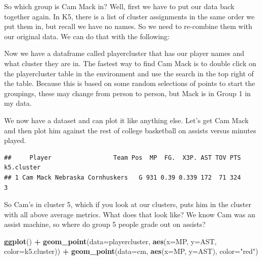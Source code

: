\documentclass[
]{book}
\newenvironment{Shaded}{\begin{snugshade}}{\end{snugshade}}
\newcommand{\DataTypeTok}[1]{\textcolor[rgb]{0.13,0.29,0.53}{#1}}
\newcommand{\KeywordTok}[1]{\textcolor[rgb]{0.13,0.29,0.53}{\textbf{#1}}}
\newcommand{\NormalTok}[1]{#1}
\newcommand{\OperatorTok}[1]{\textcolor[rgb]{0.81,0.36,0.00}{\textbf{#1}}}
\newcommand{\StringTok}[1]{\textcolor[rgb]{0.31,0.60,0.02}{#1}}
\begin{document}
So which group is Cam Mack in? Well, first we have to put our data back together again. In K5, there is a list of cluster assignments in the same order we put them in, but recall we have no names. So we need to re-combine them with our original data. We can do that with the following:

\begin{Shaded}
\end{Shaded}

Now we have a dataframe called playercluster that has our player names and what cluster they are in. The fastest way to find Cam Mack is to double click on the playercluster table in the environment and use the search in the top right of the table. Because this is based on some random selections of points to start the groupings, these may change from person to person, but Mack is in Group 1 in my data.

We now have a dataset and can plot it like anything else. Let's get Cam Mack and then plot him against the rest of college basketball on assists versus minutes played.

\begin{Shaded}
\end{Shaded}

\begin{verbatim}
##     Player                 Team Pos  MP  FG.  X3P. AST TOV PTS k5.cluster
## 1 Cam Mack Nebraska Cornhuskers   G 931 0.39 0.339 172  71 324          3
\end{verbatim}

So Cam's in cluster 5, which if you look at our clusters, puts him in the cluster with all above average metrics. What does that look like? We know Cam was an assist machine, so where do group 5 people grade out on assists?

\begin{Shaded}
\begin{Highlighting}[]
\KeywordTok{ggplot}\NormalTok{() }\OperatorTok{+}\StringTok{ }
\StringTok{  }\KeywordTok{geom_point}\NormalTok{(}\DataTypeTok{data=}\NormalTok{playercluster, }\KeywordTok{aes}\NormalTok{(}\DataTypeTok{x=}\NormalTok{MP, }\DataTypeTok{y=}\NormalTok{AST, }\DataTypeTok{color=}\NormalTok{k5.cluster)) }\OperatorTok{+}\StringTok{ }
\StringTok{  }\KeywordTok{geom_point}\NormalTok{(}\DataTypeTok{data=}\NormalTok{cm, }\KeywordTok{aes}\NormalTok{(}\DataTypeTok{x=}\NormalTok{MP, }\DataTypeTok{y=}\NormalTok{AST), }\DataTypeTok{color=}\StringTok{"red"}\NormalTok{)}
\end{Highlighting}
\end{Shaded}
\end{document}
